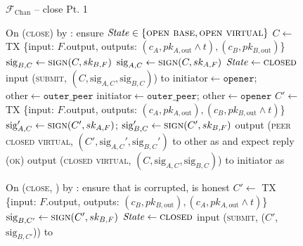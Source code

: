 \begin{figure}[H]
  \begin{systembox}{$\mathcal{F}_{\mathrm{Chan}}$ -- close Pt. 1}
    \begin{algorithmic}[1]
      \State On (\textsc{close}) by \alice:
      \Indent
        \State ensure $\mathit{State} \in \{\textsc{open base}, \textsc{open
        virtual}\}$
          \State $C \gets$ TX \{input: $F$.output, outputs: $(c_A, pk_{A,
          \mathrm{out}} \wedge t), (c_B, pk_{B, \mathrm{out}})$\}
          \State $\mathrm{sig}_{B, C} \gets \textsc{sign}(C, sk_{B, F})$
        \EndIf {}
        \State $\mathrm{sig}_{A, C} \gets \textsc{sign}(C, sk_{A, F})$
        \State $\mathit{State} \gets \textsc{closed}$
          \State input (\textsc{submit}, $(C, \mathrm{sig}_{A, C},
          \mathrm{sig}_{B, C})$) to \ledger
           
            \State $\mathrm{initiator} \gets \mathtt{opener}$; $\mathrm{other}
            \gets \mathtt{outer\_peer}$
          \Else
            \State $\mathrm{initiator} \gets \mathtt{outer\_peer}$;
            $\mathrm{other} \gets \mathtt{opener}$
          \EndIf
            \State $C' \gets$ TX \{input: $F$.output, outputs: $(c_A, pk_{A,
            \mathrm{out}}), (c_B, pk_{B, \mathrm{out}} \wedge t)$\}
            \State $\mathrm{sig}_{A, C}' \gets \textsc{sign}(C', sk_{A, F})$;
            $\mathrm{sig}_{B, C}' \gets \textsc{sign}(C', sk_{B, F})$
            \State output (\textsc{peer closed virtual}, $(C', \mathrm{sig}_{A,
            C}', \mathrm{sig}_{B, C}')$ to other as \bob and expect reply
            (\textsc{ok})
          \EndIf
          \State output (\textsc{closed virtual}, $(C, \mathrm{sig}_{A, C},
          \mathrm{sig}_{B, C})$) to initiator as \alice
        \EndIf
      \EndIndent
      \Statex

      \State On (\textsc{close}, \alice) by \adversary:
      \Indent
        \State ensure that \alice is corrupted, \bob is honest
        \State $C' \gets$ TX \{input: $F$.output, outputs: $(c_B, pk_{B,
        \mathrm{out}}), (c_A, pk_{A, \mathrm{out}} \wedge t)$\}
        \State $\mathrm{sig}_{B, C'} \gets \textsc{sign}(C', sk_{B, F})$
        \State $\mathit{State} \gets \textsc{closed}$
        \State input (\textsc{submit}, ($C'$, $\mathrm{sig}_{B, C'}$)) to
        \ledger
      \EndIndent
    \end{algorithmic}
  \end{systembox}
  \caption{}
  \label{code:functionality:chan:skeleton:close:pt1}
\end{figure}

